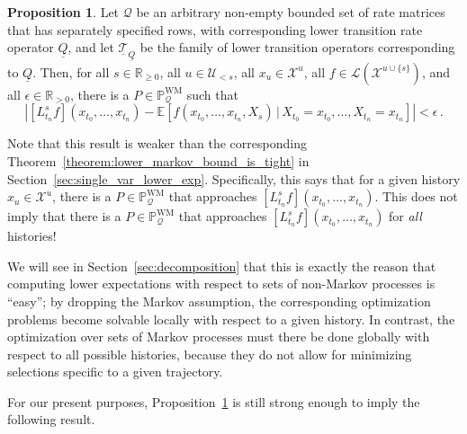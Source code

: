 \documentclass[10pt]{paper}
\theoremstyle{definition}
\newtheorem{proposition}[theorem]{Proposition}
\newcommand{\reals}{\mathbb{R}}
\newcommand{\realspos}{\reals_{>0}}
\newcommand{\realsnonneg}{\reals_{\geq 0}}
\newcommand{\states}{\mathcal{X}}
\newcommand{\processes}{\mathbb{P}}
\newcommand{\mprocesses}{\processes^{\mathrm{M}}}
\newcommand{\wmprocesses}{\processes^{\mathrm{WM}}}
\newcommand{\gambles}{\mathcal{L}}
\newcommand{\rateset}{\mathcal{Q}}
\newcommand{\lrate}{\underline{Q}}
\newcommand{\norm}[1]{\left\lVert #1 \right\rVert}
\newcommand{\abs}[1]{\left\vert #1 \right\vert}
\begin{document}
\begin{proposition}\label{prop:multi_var_single_future_tight}
Let $\rateset$ be an arbitrary non-empty bounded set of rate matrices that has separately specified rows, with corresponding lower transition rate operator $\lrate$, and let $\underline{\mathcal{T}}_{\lrate}$ be the family of lower transition operators corresponding to $\lrate$. Then, for all $s\in\realsnonneg$, all $u\in\mathcal{U}_{<s}$, all $x_u\in\states^u$, all $f\in\gambles(\states^{u\cup\{s\}})$, and all $\epsilon\in\realspos$, there is a $P\in\wmprocesses_\rateset$ such that
\begin{equation*}
\abs{\left[L_{t_n}^sf\right](x_{t_0},\ldots,x_{t_n}) - \mathbb{E}\left[f(x_{t_0},\ldots,x_{t_n},X_s)\,\vert\,X_{t_0}=x_{t_0},\ldots,X_{t_n}=x_{t_n}\right]} < \epsilon\,.
\end{equation*}
\end{proposition}

Note that this result is weaker than the corresponding Theorem~\ref{theorem:lower_markov_bound_is_tight} in Section~\ref{sec:single_var_lower_exp}. Specifically, this says that for a given history $x_u\in\states^u$, there is a $P\in\wmprocesses_\rateset$ that approaches $\left[L_{t_n}^sf\right](x_{t_0},\ldots,x_{t_n})$. This does not imply that there is a $P\in\wmprocesses_\rateset$ that approaches $\left[L_{t_n}^sf\right](x_{t_0},\ldots,x_{t_n})$ for \emph{all} histories! 

We will see in Section~\ref{sec:decomposition} that this is exactly the reason that computing lower expectations with respect to sets of non-Markov processes is ``easy''; by dropping the Markov assumption, the corresponding optimization problems become solvable locally with respect to a given history. In contrast, the optimization over sets of Markov processes must there be done globally with respect to all possible histories, because they do not allow for minimizing selections specific to a given trajectory.

For our present purposes, Proposition~\ref{prop:multi_var_single_future_tight} is still strong enough to imply the following result.

\end{document}
